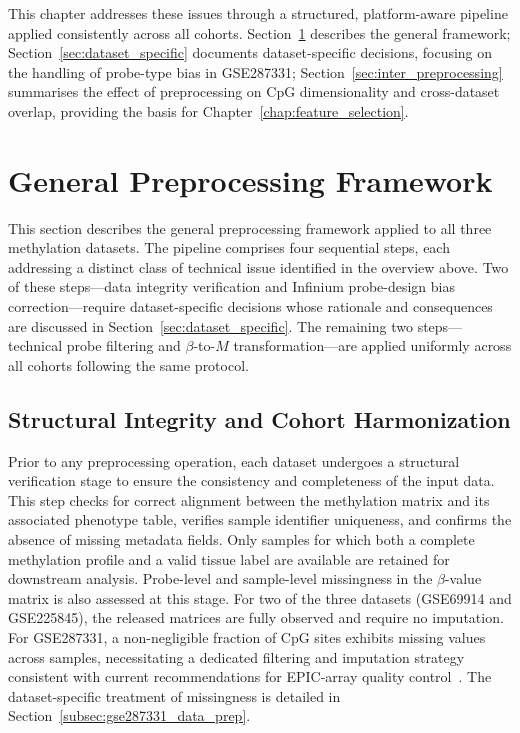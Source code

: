 This chapter addresses these issues through a structured, platform-aware pipeline
applied consistently across all cohorts. Section~\ref{sec:pipeline} describes
the general framework; Section~\ref{sec:dataset_specific} documents
dataset-specific decisions, focusing on the handling of probe-type bias in
GSE287331; Section~\ref{sec:inter_preprocessing} summarises the effect of
preprocessing on CpG dimensionality and cross-dataset overlap, providing the
basis for Chapter~\ref{chap:feature_selection}.

\section{General Preprocessing Framework}
\label{sec:pipeline}

This section describes the general preprocessing framework applied to all 
three methylation datasets. The pipeline comprises four sequential steps, 
each addressing a distinct class of technical issue identified in the 
overview above. Two of these steps—data integrity verification and 
Infinium probe-design bias correction—require dataset-specific decisions 
whose rationale and consequences are discussed in 
Section~\ref{sec:dataset_specific}. The remaining two steps—technical 
probe filtering and $\beta$-to-$M$ transformation—are applied uniformly 
across all cohorts following the same protocol.

\subsection{Structural Integrity and Cohort Harmonization}
\label{subsec:step0}

Prior to any preprocessing operation, each dataset undergoes a structural 
verification stage to ensure the consistency and completeness of the input 
data. This step checks for correct alignment between the methylation matrix 
and its associated phenotype table, verifies sample identifier uniqueness, 
and confirms the absence of missing metadata fields. Only samples for which 
both a complete methylation profile and a valid tissue label are available 
are retained for downstream analysis.
Probe-level and sample-level missingness in the $\beta$-value matrix is 
also assessed at this stage. For two of the three datasets (GSE69914 and 
GSE225845), the released matrices are fully observed and require no 
imputation. For GSE287331, a non-negligible fraction of CpG sites exhibits 
missing values across samples, necessitating a dedicated filtering and 
imputation strategy consistent with current recommendations for 
EPIC-array quality control~\cite{islam2019_pediatric_dnamm, mansell2019guidance}. The 
dataset-specific treatment of missingness is detailed in 
Section~\ref{subsec:gse287331_data_prep}.

